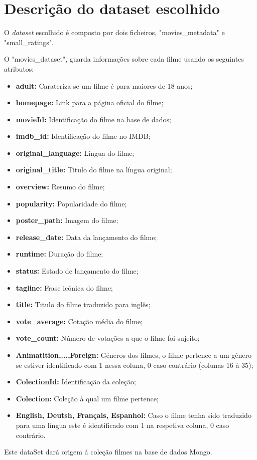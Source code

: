 \section{Descrição do dataset escolhido}

O \textit{dataset} escolhido é composto por dois ficheiros, "movies\_metadata" e "small\_ratings". \newline

\par O "movies\_dataset", guarda informações sobre cada filme usando os seguintes atributos:

\begin{itemize}
    \item \textbf{adult:} Carateriza se um filme é para maiores de 18 anos;
    \item \textbf{homepage:} Link para a página oficial do filme;
    \item \textbf{movieId:} Identificação do filme na base de dados;
    \item \textbf{imdb\_id:} Identificação do filme no IMDB;
    \item \textbf{original\_language:} Língua do filme;
    \item \textbf{original\_title:} Titulo do filme na língua original;
    \item \textbf{overview:} Resumo do filme;
    \item \textbf{popularity:} Popularidade do filme;
    \item \textbf{poster\_path:} Imagem do filme;
    \item \textbf{release\_date:} Data da lançamento do filme;
    \item \textbf{runtime:} Duração do filme;
    \item \textbf{status:} Estado de lançamento do filme;
    \item \textbf{tagline:} Frase icónica do filme;
    \item \textbf{title:} Titulo do filme traduzido para inglês;
    \item \textbf{vote\_average:} Cotação média do filme;
    \item \textbf{vote\_count:} Número de votações a que o filme foi sujeito;
    \item \textbf{Animatition,...,Foreign:} Géneros dos filmes, o filme pertence a um género se estiver identificado com 1 nessa coluna, 0 caso contrário (colunas 16 à 35);
    \item \textbf{ColectionId:} Identificação da coleção;
    \item \textbf{Colection:} Coleção à qual um filme pertence;
    \item \textbf{English, Deutsh, Français, Espanhol:} Caso o filme tenha sido traduzido para uma língua este é identificado com 1 na respetiva coluna, 0 caso contrário.
    \end{itemize}
Este dataSet dará origem á coleção filmes na base de dados Mongo.    

